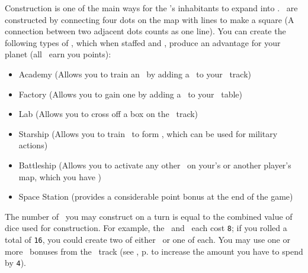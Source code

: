 Construction is one of the main ways for the \planet's inhabitants to expand into \outerspace.
\armaments\ are constructed by connecting four dots on the map with lines to make a square (A connection between two adjacent dots counts as one line).
\newline\newline
You can create the following types of \armaments, which when staffed and \activated, produce an advantage for your planet (all \armaments\ earn you points):
\begin{itemize}
  \item Academy (Allows you to train an \astronaut\ by adding a \gainastronautsymbol\ to your \population\ track)
  \item Factory (Allows you to gain one \currency by adding a \gaincurrency\ to your \currency\ table)
  \item Lab (Allows you to cross off a box on the \tech\ track)
  \item Starship (Allows you to train \astronauts\ to form \squadrons, which can be used for military actions)
  \item Battleship (Allows you to activate any other \armaments\ on your's or another player's map, which you have \reach)
  \item Space Station (provides a considerable point bonus at the end of the game)
\end{itemize}
The number of \armaments\ you may construct on a turn is equal to the combined value of dice used for construction.  For example, the \academy\ and \factory\ each cost \texttt{8}; if you rolled a total of \texttt{16}, you could create two of either \armaments\ or one of each.  You may use one or more \greatperson\ bonuses from the \population\ track (see , p.\pageref{sec:population} to increase the amount you have to spend by \texttt{4}).
